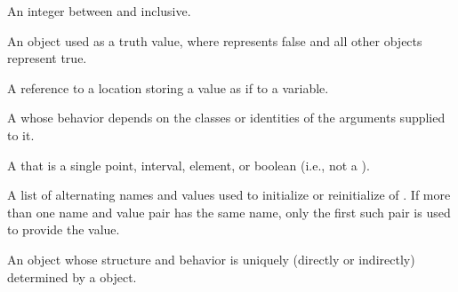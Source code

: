 \begin{glossary-list}

\glent[fixnum]
%
%
%
An integer between  and
 inclusive.


%
%
%
%
An object used as a truth value, where \nil{} represents false and all other
objects represent true.


%
%
%
A reference to a location storing a value as if to a variable.


%
%
A  whose behavior depends on the classes or identities of the
arguments supplied to it.


%
%
%
A  that is a single point, interval, element, or
boolean (i.e., not a ).


%
%
%
%
A list of alternating names and values used to initialize or reinitialize
 of .  If more than one name and value pair
has the same name, only the first such pair is used to provide the value.


\glent[instance]
%
%
%
An object whose structure and behavior is uniquely (directly or indirectly)
determined by a  object.



\end{glossary-list}
